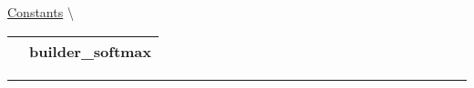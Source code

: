 \hypertarget{ecldoc:logisticregression.constants.builder_softmax}{}
\hspace{0pt} \hyperlink{ecldoc:LogisticRegression.Constants}{Constants} \textbackslash 

{\renewcommand{\arraystretch}{1.5}
\begin{tabularx}{\textwidth}{|>{\raggedright\arraybackslash}l|X|}
\hline
\hspace{0pt}\mytexttt{\color{red} } & \textbf{builder\_softmax} \\
\hline
\end{tabularx}
}

\par


\rule{\linewidth}{0.5pt}


